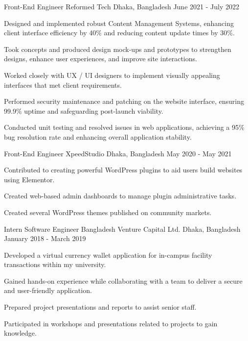 \begin{cventries}
    \cventry
        {Front-End Engineer}
        {Reformed Tech}
        {Dhaka, Bangladesh}
        {June 2021 - July 2022}
        {
            \begin{cvitems}
                \item {Designed and implemented robust Content Management Systems, enhancing client interface efficiency by 40\% and reducing content update times by 30\%.}
                \item {Took concepts and produced design mock-ups and prototypes to strengthen designs, enhance user experiences, and improve site interactions.}
                \item {Worked closely with UX / UI designers to implement visually appealing interfaces that met client requirements.}
                \item {Performed security maintenance and patching on the website interface, ensuring 99.9\% uptime and safeguarding post-launch viability.}
                \item {Conducted unit testing and resolved issues in web applications, achieving a 95\% bug resolution rate and enhancing overall application stability.}
            \end{cvitems}
        }

    \cventry
        {Front-End Engineer}
        {XpeedStudio}
        {Dhaka, Bangladesh}
        {May 2020 - May 2021}
        {
            \begin{cvitems}
                \item {Contributed to creating powerful WordPress plugins to aid users build websites using Elementor.}
                \item {Created web-based admin dashboards to manage plugin administrative tasks.}
                \item {Created several WordPress themes published on community markets.}
            \end{cvitems}
        }

\end{cventries}


\begin{cventries}

    \cventry
        {Intern Software Engineer}
        {Bangladesh Venture Capital Ltd.}
        {Dhaka, Bangladesh}
        {January 2018 - March 2019}
        {
            \begin{cvitems}
                \item {Developed a virtual currency wallet application for in-campus facility transactions within my university.}
                \item {Gained hands-on experience while collaborating with a team to deliver a secure and user-friendly application.}
                \item {Prepared project presentations and reports to assist senior staff.}
                \item {Participated in workshops and presentations related to projects to gain knowledge.}
            \end{cvitems}
        }

\end{cventries}
